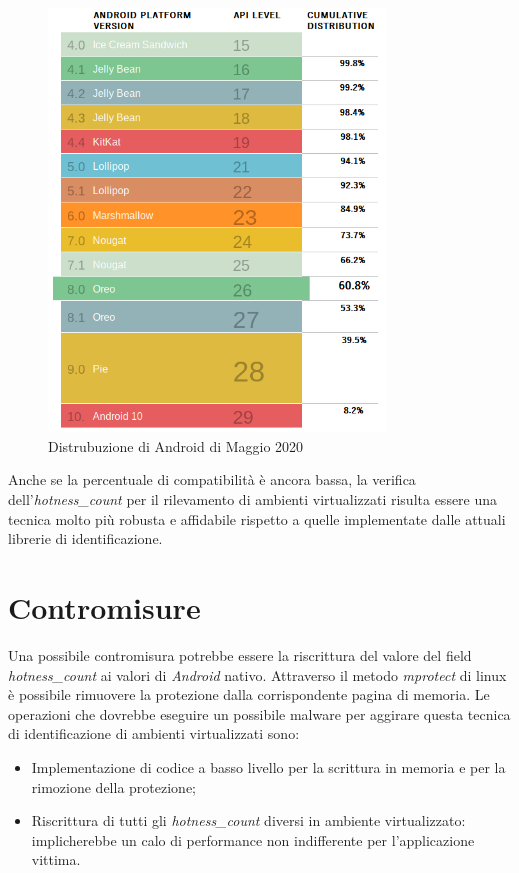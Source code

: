 \begin{figure} [H]
\includegraphics[width=0.8\textwidth]{figures/androidOSdistribution}
\caption[Distrubuzione di Android di Maggio 2020]{Distrubuzione di Android di Maggio 2020
\label{fig:androidOSdistribution}}
\end{figure}

Anche se la percentuale di compatibilità è ancora bassa, la verifica dell'\emph{hotness\_count} per il rilevamento di ambienti virtualizzati risulta essere una tecnica molto più robusta e affidabile rispetto a quelle implementate dalle attuali librerie di identificazione.

\section{Contromisure}

Una possibile contromisura potrebbe essere la riscrittura del valore del field \emph{hotness\_count} ai valori di \emph{Android} nativo. Attraverso il metodo \emph{mprotect} di linux è possibile rimuovere la protezione dalla corrispondente pagina di memoria. 
Le operazioni che dovrebbe eseguire un possibile malware per aggirare questa tecnica di identificazione di ambienti virtualizzati sono:
\begin{itemize}
    \item Implementazione di codice a basso livello per la scrittura in memoria e per la rimozione della protezione;
    \item Riscrittura di tutti gli \emph{hotness\_count} diversi in ambiente virtualizzato: implicherebbe un calo di performance non indifferente per l'applicazione vittima.
\end{itemize}

